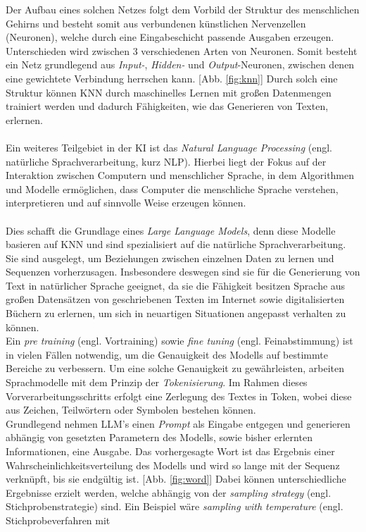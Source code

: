 Der Aufbau eines solchen Netzes folgt dem Vorbild der Struktur des menschlichen Gehirns und besteht somit aus verbundenen künstlichen Nervenzellen (Neuronen), welche durch eine Eingabeschicht passende Ausgaben erzeugen. \cite*{morrKuenstlicheNeuronaleNetze} Unterschieden wird zwischen 3 verschiedenen Arten von Neuronen. Somit besteht ein Netz grundlegend aus \textit{Input-}, \textit{Hidden-} und \textit{Output}-Neuronen, zwischen denen eine gewichtete Verbindung herrschen kann. \cite*{NeuronaleNetzeEinfuhrung} [Abb. \ref{fig:knn}] Durch solch eine Struktur können KNN durch maschinelles Lernen mit großen Datenmengen trainiert werden und dadurch Fähigkeiten, wie das Generieren von Texten, erlernen. \cite*{seemannKuenstlicheIntelligenzLarge}\\\\ Ein weiteres Teilgebiet in der KI ist das \textit{Natural Language Processing} (engl. natürliche Sprachverarbeitung, kurz NLP). Hierbei liegt der Fokus auf der Interaktion zwischen Computern und menschlicher Sprache, in dem Algorithmen und Modelle ermöglichen, dass Computer die menschliche Sprache verstehen, interpretieren und auf sinnvolle Weise erzeugen können. \cite*{muruganNaturalLanguageProcessing2024} \\\\ Dies schafft die Grundlage eines \textit{Large Language Models}, denn diese Modelle basieren auf KNN und sind spezialisiert auf die natürliche Sprachverarbeitung. \cite*{seemannKuenstlicheIntelligenzLarge} Sie sind ausgelegt, um Beziehungen zwischen einzelnen Daten zu lernen und Sequenzen vorherzusagen. Insbesondere deswegen sind sie für die Generierung von Text in natürlicher Sprache geeignet, da sie die Fähigkeit besitzen Sprache aus großen Datensätzen von geschriebenen Texten im Internet sowie digitalisierten Büchern zu erlernen, um sich in neuartigen Situationen angepasst verhalten zu können. \cite*{okerlundWhatChatterbox2022} \cite*{authorityofthehouseoflordsLargeLanguageModels} \\Ein \textit{pre training} (engl. Vortraining) sowie \textit{fine tuning} (engl. Feinabstimmung) ist in vielen Fällen notwendig, um die Genauigkeit des Modells auf bestimmte Bereiche zu verbessern. \cite{HowLLMsWork} Um eine solche Genauigkeit zu gewährleisten, arbeiten Sprachmodelle mit dem Prinzip der \textit{Tokenisierung}. Im Rahmen dieses Vorverarbeitungsschritts erfolgt eine Zerlegung des Textes in Token, wobei diese aus Zeichen, Teilwörtern oder Symbolen bestehen können. \cite*{naveedComprehensiveOverviewLarge2024} \\ Grundlegend nehmen LLM's einen \textit{Prompt} als Eingabe entgegen und generieren abhängig von gesetzten Parametern des Modells, sowie bisher erlernten Informationen, eine Ausgabe. Das vorhergesagte Wort ist das Ergebnis einer Wahrscheinlichkeitsverteilung des Modells und wird so lange mit der Sequenz verknüpft, bis sie endgültig ist. [Abb. \ref{fig:word}] Dabei können unterschiedliche Ergebnisse erzielt werden, welche abhängig von der \textit{sampling strategy} (engl. Stichprobenstrategie) sind. \cite*{cholletDeepLearningPython2018} Ein Beispiel wäre \textit{sampling with temperature} (engl. Stichprobeverfahren mit 